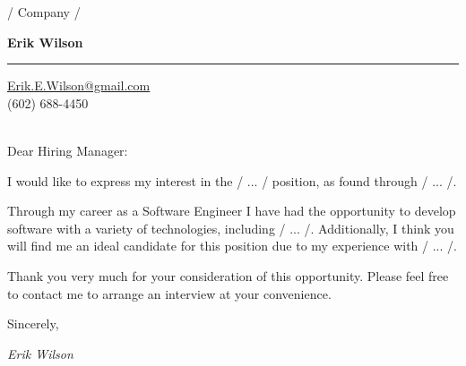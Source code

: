 \documentclass{letter} %
\begin{document}
\signature{Erik Wilson}           %
\longindentation=0pt                       %
\let\raggedleft\raggedright                %

\begin{letter}{/ Company /}

\begin{flushright}
\hfill{\Large\bf Erik Wilson}
\medskip\hrule height 1pt
\hfill \href{mailto:Erik.E.Wilson@gmail.com}{Erik.E.Wilson@gmail.com} \\
\hfill (602) 688-4450 \\
\end{flushright}

\opening{}

\mbox{}\\

Dear Hiring Manager:

\noindent
I would like to express my interest in the / ... / position, as found through / ... /.

\noindent
Through my career as a Software Engineer I have had the opportunity to develop software with a variety of technologies, including / ... /. Additionally, I think you will find me an ideal candidate for this position due to my experience with / ... /.

\noindent
Thank you very much for your consideration of this opportunity. Please feel free to contact me to arrange an interview at your convenience.

\hbox{}

Sincerely,

{\large \emph{Erik Wilson}}

\end{letter}
\end{document}
